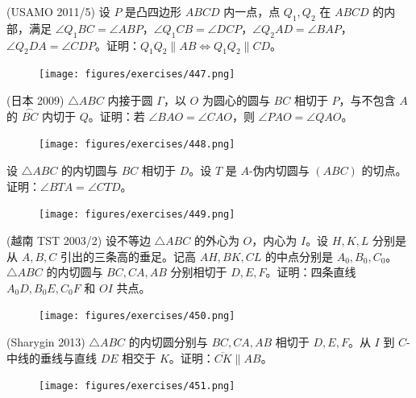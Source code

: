 \newpage 
\begin{exercise}
    (USAMO 2011/5) 设 $P$ 是凸四边形 $ABCD$ 内一点，点 $Q_1, Q_2$ 在 $ABCD$ 的内部，满足 $\angle Q_1BC = \angle ABP$，$\angle Q_1CB = \angle DCP$，$\angle Q_2AD = \angle BAP$，$\angle Q_2DA = \angle CDP$。证明：$Q_1Q_2 \parallel AB \iff Q_1Q_2 \parallel CD$。
\end{exercise}
\begin{figure}[H]
    \centering
    \texttt{[image: figures/exercises/447.png]}
\end{figure}

\begin{exercise}
    (日本 2009) $\triangle ABC$ 内接于圆 $\Gamma$，以 $O$ 为圆心的圆与 $BC$ 相切于 $P$，与不包含 $A$ 的 $\overset{\frown}{BC}$ 内切于 $Q$。证明：若 $\angle BAO = \angle CAO$，则 $\angle PAO = \angle QAO$。
\end{exercise}
\begin{figure}[H]
    \centering
    \texttt{[image: figures/exercises/448.png]}
\end{figure}


\newpage 
\begin{exercise}
    设 $\triangle ABC$ 的内切圆与 $BC$ 相切于 $D$。设 $T$ 是 $A$-伪内切圆与 $(ABC)$ 的切点。证明：$\angle BTA = \angle CTD$。
\end{exercise}
\begin{figure}[H]
    \centering
    \texttt{[image: figures/exercises/449.png]}
\end{figure}

\begin{exercise}
    (越南 TST 2003/2) 设不等边 $\triangle ABC$ 的外心为 $O$，内心为 $I$。设 $H, K, L$ 分别是从 $A, B, C$ 引出的三条高的垂足。记高 $AH, BK, CL$ 的中点分别是 $A_0, B_0, C_0$。$\triangle ABC$ 的内切圆与 $BC, CA, AB$ 分别相切于 $D, E, F$。证明：四条直线 $A_0D, B_0E, C_0F$ 和 $OI$ 共点。
\end{exercise}
\begin{figure}[H]
    \centering
    \texttt{[image: figures/exercises/450.png]}
\end{figure}


\newpage 
\begin{exercise}
    (Sharygin 2013) $\triangle ABC$ 的内切圆分别与 $BC, CA, AB$ 相切于 $D, E, F$。从 $I$ 到 $C$-中线的垂线与直线 $DE$ 相交于 $K$。证明：$\overline{CK} \parallel AB$。
\end{exercise}
\begin{figure}[H]
    \centering
    \texttt{[image: figures/exercises/451.png]}
\end{figure}

